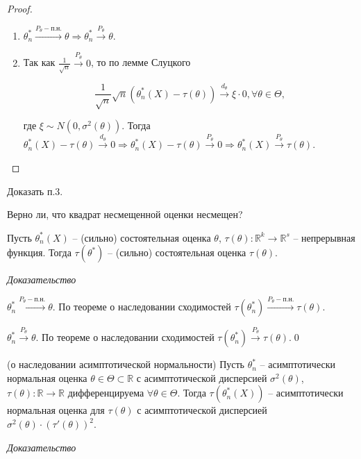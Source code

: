 \begin{proof} \
\begin{enumerate}
    \item $\displaystyle \theta _{n}^{*}\xrightarrow{P_{\theta } -п.н.} \theta \Rightarrow \theta _{n}^{*}\xrightarrow{P_{\theta }} \theta $.
    
    \item Так как $\displaystyle \frac{1}{\sqrt{n}}\xrightarrow{P_{\theta }} 0$, то по лемме Слуцкого


\begin{equation*}
\frac{1}{\sqrt{n}}\sqrt{n}\left( \theta _{n}^{*}( X) -\tau ( \theta )\right)\xrightarrow{d_{\theta }} \xi \cdotp 0,\forall \theta \in \Theta ,
\end{equation*}


где $\displaystyle \xi \sim N\left( 0,\sigma ^{2}( \theta )\right)$. Тогда $\displaystyle \theta _{n}^{*}( X) -\tau ( \theta )\xrightarrow{d_{\theta }} 0\Rightarrow \theta _{n}^{*}( X) -\tau ( \theta )\xrightarrow{P_{\theta }} 0\Rightarrow \theta _{n}^{*}( X)\xrightarrow{P_{\theta }} \tau ( \theta )$.
\end{enumerate}
\end{proof}
 
\begin{exercise}
Доказать п.3.
\end{exercise}
\begin{exercise}
Верно ли, что квадрат несмещенной оценки несмещен?
\end{exercise}

\begin{proposition}
Пусть $\displaystyle \theta _{n}^{*}( X)$ -- (сильно) состоятельная оценка $\displaystyle \theta $, $\displaystyle \tau ( \theta ) :\mathbb{R}^{k}\rightarrow \mathbb{R}^{s}$ -- непрерывная функция. Тогда $\displaystyle \tau \left( \theta ^{*}\right)$ -- (сильно) состоятельная оценка $\displaystyle \tau ( \theta )$.
\end{proposition}
\textit{Доказательство}

$\displaystyle \theta _{n}^{*}\xrightarrow{P_{\theta } -п.н.} \theta $. По теореме о наследовании сходимостей $\displaystyle \tau \left( \theta _{n}^{*}\right)\xrightarrow{P_{\theta } -п.н.} \tau ( \theta )$.

$\displaystyle \theta _{n}^{*}\xrightarrow{P_{\theta }} \theta $. По теореме о наследовании сходимостей $\displaystyle \tau \left( \theta _{n}^{*}\right)\xrightarrow{P_{\theta }} \tau ( \theta )$.\qed 
\begin{lemma}
(о наследовании асимптотической нормальности) Пусть $\displaystyle \theta _{n}^{*}$ -- асимптотически нормальная оценка $\displaystyle \theta \in \Theta \subset \mathbb{R}$ с асимптотической дисперсией $\displaystyle \sigma ^{2}( \theta )$, $\displaystyle \tau ( \theta ) :\mathbb{R}\rightarrow \mathbb{R}$ дифференцируема $\displaystyle \forall \theta \in \Theta $. Тогда $\displaystyle \tau \left( \theta _{n}^{*}( X)\right)$ -- асимптотически нормальная оценка для $\displaystyle \tau ( \theta )$ с асимптотической дисперсией $\displaystyle \sigma ^{2}( \theta ) \cdotp ( \tau '( \theta ))^{2}$.
\end{lemma}
\textit{Доказательство}

